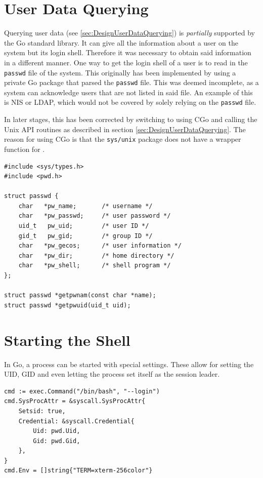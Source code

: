 \documentclass[10pt,a4paper,titlepage,twoside,english,final]{zhawreprt}
\begin{document}
\section{User Data Querying}\label{sec:ImplUserDataQuerying}
Querying user data (see \ref{sec:DesignUserDataQuerying}) is \textit{partially} supported by the \gls{Go} standard library.
It can give all the information about a user on the system but its \gls{login} \gls{shell}.
Therefore it was necessary to obtain said information in a different manner.
One way to get the \gls{login} \gls{shell} of a user is to read in the \texttt{passwd} file of the system.
This originally has been implemented by using a private \gls{Go} package that parsed the \texttt{passwd} file.
This was deemed incomplete, as a system can acknowledge users that are not listed in said file.
An example of this is \gls{NIS} or \gls{LDAP}, which would not be covered by solely relying on the \texttt{passwd} file.

In later stages, this has been corrected by switching to using \gls{CGo} and calling the \gls{Unix} \gls{API} routines \cite{getpw} as described in section \ref{sec:DesignUserDataQuerying}.
The reason for using \gls{CGo} is that the \texttt{sys/unix} package does not have a wrapper function for \cite{getpw}.

\setlistingC
\begin{lstlisting}[caption={Definition of passwd and {\cite{getpw}}},label=lst:PasswdDefinition]
#include <sys/types.h>
#include <pwd.h>

struct passwd {
	char   *pw_name;       /* username */
	char   *pw_passwd;     /* user password */
	uid_t   pw_uid;        /* user ID */
	gid_t   pw_gid;        /* group ID */
	char   *pw_gecos;      /* user information */
	char   *pw_dir;        /* home directory */
	char   *pw_shell;      /* shell program */
};

struct passwd *getpwnam(const char *name);
struct passwd *getpwuid(uid_t uid);
\end{lstlisting}

\section{Starting the Shell}\label{sec:ImplStartingTheShell}
In \gls{Go}, a process can be started with special settings.
These allow for setting the \gls{UID}, \gls{GID} and even letting the process set itself as the session leader.

\setlistingGo
\begin{lstlisting}[caption={Starting a process in \gls{Go}},label=lst:StartingAProcessInGo]
cmd := exec.Command("/bin/bash", "--login")
cmd.SysProcAttr = &syscall.SysProcAttr{
	Setsid: true,
	Credential: &syscall.Credential{
		Uid: pwd.Uid,
		Gid: pwd.Gid,
	},
}
cmd.Env = []string{"TERM=xterm-256color"}
\end{lstlisting}
\end{document}
